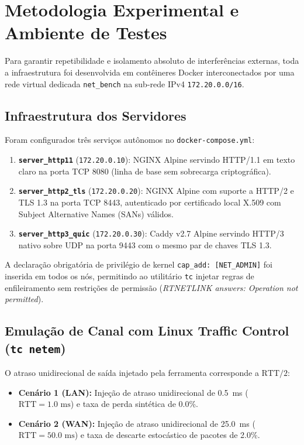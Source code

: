 \documentclass[12pt]{article}
\begin{document}
\section{Metodologia Experimental e Ambiente de Testes}

Para garantir repetibilidade e isolamento absoluto de interferências externas, toda a infraestrutura foi desenvolvida em contêineres Docker interconectados por uma rede virtual dedicada \texttt{net\_bench} na sub-rede IPv4 \texttt{172.20.0.0/16}.

\subsection{Infraestrutura dos Servidores}
Foram configurados três serviços autônomos no \texttt{docker-compose.yml}:
\begin{enumerate}
    \item \textbf{\texttt{server\_http11}} (\texttt{172.20.0.10}): NGINX Alpine servindo HTTP/1.1 em texto claro na porta TCP 8080 (linha de base sem sobrecarga criptográfica).
    \item \textbf{\texttt{server\_http2\_tls}} (\texttt{172.20.0.20}): NGINX Alpine com suporte a HTTP/2 e TLS 1.3 na porta TCP 8443, autenticado por certificado local X.509 com Subject Alternative Names (SANs) válidos.
    \item \textbf{\texttt{server\_http3\_quic}} (\texttt{172.20.0.30}): Caddy v2.7 Alpine servindo HTTP/3 nativo sobre UDP na porta 9443 com o mesmo par de chaves TLS 1.3.
\end{enumerate}
A declaração obrigatória de privilégio de kernel \texttt{cap\_add: [NET\_ADMIN]} foi inserida em todos os nós, permitindo ao utilitário \texttt{tc} injetar regras de enfileiramento sem restrições de permissão (\textit{RTNETLINK answers: Operation not permitted}).

\subsection{Emulação de Canal com Linux Traffic Control (\texttt{tc netem})}
O atraso unidirecional de saída injetado pela ferramenta corresponde a $\text{RTT}/2$:
\begin{itemize}
    \item \textbf{Cenário 1 (LAN):} Injeção de atraso unidirecional de 0.5~ms ($\text{RTT} = 1.0\text{ ms}$) e taxa de perda sintética de 0.0\%.
    \item \textbf{Cenário 2 (WAN):} Injeção de atraso unidirecional de 25.0~ms ($\text{RTT} = 50.0\text{ ms}$) e taxa de descarte estocástico de pacotes de 2.0\%.
\end{itemize}
\end{document}
